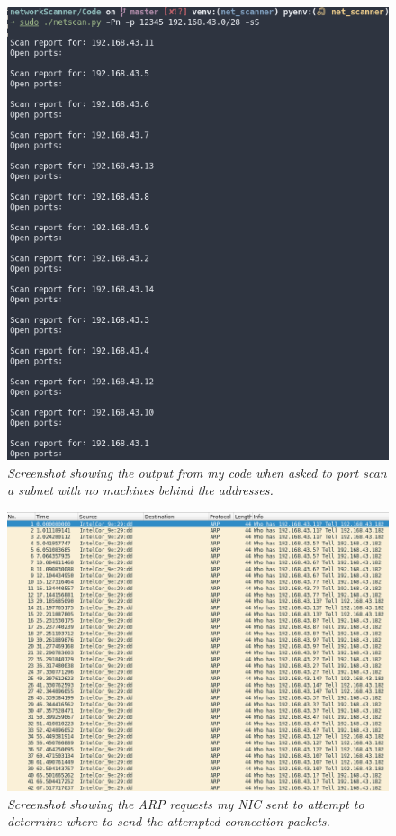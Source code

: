 \documentclass[titlepage]{article}
\begin{document}
\begin{figure}[H]
  \centering
  \includegraphics[width=\textwidth]{nocheckhostoutput.png}
  \caption{\textit{%
    Screenshot showing the output from my code when asked to port scan a subnet
    with no machines behind the addresses.
}}\label{nocheckoutput}
\end{figure}

\begin{figure}[H]
  \centering
  \includegraphics[width=\textwidth]{nocheckpcap.png}
  \caption{\textit{%
    Screenshot showing the ARP requests my NIC sent to attempt to determine
    where to send the attempted connection packets.
}}\label{nocheckWireshark}
\end{figure}
\end{document}

